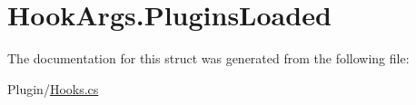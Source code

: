 \hypertarget{structOTA_1_1Plugin_1_1HookArgs_1_1PluginsLoaded}{}\section{Hook\+Args.\+Plugins\+Loaded}
\label{structOTA_1_1Plugin_1_1HookArgs_1_1PluginsLoaded}


The documentation for this struct was generated from the following file\+:\begin{DoxyCompactItemize}
\item 
Plugin/\hyperlink{Hooks_8cs}{Hooks.\+cs}\end{DoxyCompactItemize}
